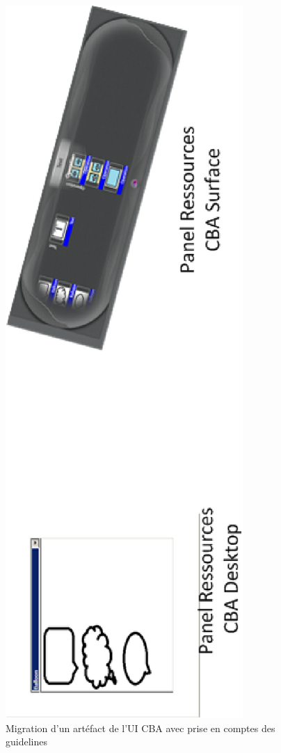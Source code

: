 \begin{figure}[h]
\begin{center}
\includegraphics[angle=270, scale=.5]{chap1/img-27} 
\caption{Migration d'un artéfact de l'UI CBA avec prise en comptes des guidelines}\label{fig:chap2:9}
\end{center}
\end{figure}

